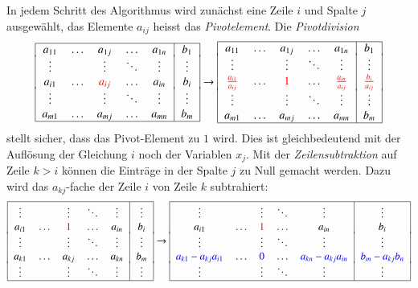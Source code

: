 In jedem Schritt des Algorithmus wird zunächst eine Zeile $i$ und
Spalte $j$ ausgewählt, das Elemente $a_{ij}$ heisst das {\em Pivotelement}.
%
Die {\em Pivotdivision}
\[
\begin{tabular}{|>{$}c<{$}>{$}c<{$}>{$}c<{$}>{$}c<{$}>{$}c<{$}|>{$}c<{$}|}
\hline
a_{11}&\dots &a_{1j}&\dots &a_{1n}&b_1   \\[-2pt]
\vdots&      &\vdots&\ddots&\vdots&\vdots\\
a_{i1}&\dots &{\color{red}a_{ij}}&\dots &a_{in}&b_i   \\[-2pt]
\vdots&      &\vdots&\ddots&\vdots&\vdots\\
a_{m1}&\dots &a_{mj}&\dots &a_{mn}&b_m   \\
\hline
\end{tabular}
\rightarrow
\begin{tabular}{|>{$}c<{$}>{$}c<{$}>{$}c<{$}>{$}c<{$}>{$}c<{$}|>{$}c<{$}|}
\hline
a_{11}&\dots &a_{1j}&\dots &a_{1n}&b_1   \\[-2pt]
\vdots&      &\vdots&\ddots&\vdots&\vdots\\
{\color{red}\frac{a_{i1}}{a_{ij}}}&\dots &{\color{red}1}&\dots &{\color{red}\frac{a_{in}}{a_{ij}}}&{\color{red}\frac{b_i}{a_{ij}}}\\[-2pt]
\vdots&      &\vdots&\ddots&\vdots&\vdots\\
a_{m1}&\dots &a_{mj}&\dots &a_{mn}&b_m   \\
\hline
\end{tabular}
\]
stellt sicher, dass das Pivot-Element zu $1$ wird.
Dies ist gleichbedeutend mit der Auflösung der Gleichung $i$ noch der
Variablen $x_j$.
Mit der {\em Zeilensubtraktion} auf Zeile $k>i$ können die Einträge in der
%
Spalte $j$ zu Null gemacht werden.
Dazu wird das $a_{kj}$-fache der Zeile $i$ von Zeile $k$ subtrahiert:
\[
\begin{tabular}{|>{$}c<{$}>{$}c<{$}>{$}c<{$}>{$}c<{$}>{$}c<{$}|>{$}c<{$}|}
\hline
\vdots&      &\vdots&\ddots&\vdots&\vdots\\
a_{i1}&\dots &{\color{red}1}&\dots &a_{in}&b_i   \\[-2pt]
\vdots&      &\vdots&\ddots&\vdots&\vdots\\
a_{k1}&\dots &a_{kj}&\dots &a_{kn}&b_m   \\[-2pt]
\vdots&      &\vdots&\ddots&\vdots&\vdots\\
\hline
\end{tabular}
\rightarrow
\begin{tabular}{|>{$}c<{$}>{$}c<{$}>{$}c<{$}>{$}c<{$}>{$}c<{$}|>{$}c<{$}|}
\hline
\vdots&      &\vdots&\ddots&\vdots&\vdots\\
a_{i1}&\dots &{\color{red}1}&\dots &a_{in}&b_i   \\[-2pt]
\vdots&      &\vdots&\ddots&\vdots&\vdots\\
{\color{blue}a_{k1}-a_{kj}a_{i1}}&\dots &{\color{blue}0}&\dots &{\color{blue}a_{kn}-a_{kj}a_{in}}&{\color{blue}b_m-a_{kj}b_{n}}\\[-2pt]
\vdots&      &\vdots&\ddots&\vdots&\vdots\\
\hline
\end{tabular}
\]
